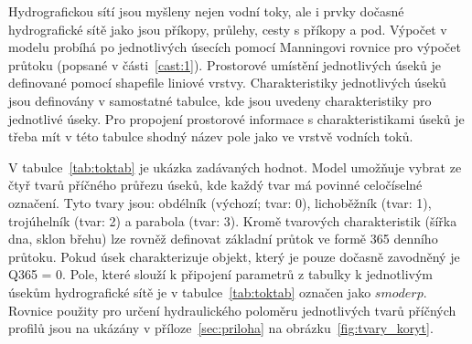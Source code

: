 Hydrografickou sítí jsou myšleny nejen vodní toky, ale i prvky dočasné hydrografické sítě jako jsou příkopy, průlehy, cesty s příkopy a pod. Výpočet v modelu probíhá po jednotlivých úsecích pomocí Manningovi rovnice pro výpočet průtoku (popsané v části~\ref{cast:1}). Prostorové umístění jednotlivých úseků je definované pomocí shapefile liniové vrstvy. Charakteristiky jednotlivých úseků jsou definovány v samostatné tabulce, kde jsou uvedeny charakteristiky pro jednotlivé úseky. Pro propojení prostorové informace s charakteristikami úseků je třeba mít v této tabulce shodný název pole jako ve vrstvě vodních toků.

V tabulce~\ref{tab:toktab} je ukázka zadávaných hodnot.  Model umožňuje vybrat ze čtyř tvarů příčného průřezu úseků, kde každý tvar má povinné celočíselné označení. Tyto tvary jsou: obdélník (výchozí; tvar: 0), lichoběžník (tvar: 1), trojúhelník (tvar: 2) a parabola (tvar: 3). Kromě tvarových charakteristik (šířka dna, sklon břehu) lze rovněž definovat základní průtok ve formě 365 denního průtoku. Pokud úsek charakterizuje objekt, který je pouze dočasně zavodněný je Q365 = 0. Pole, které slouží k připojení parametrů z tabulky k jednotlivým úsekům hydrografické sítě je v tabulce~\ref{tab:toktab} označen jako $smoderp$. Rovnice použity pro určení hydraulického poloměru jednotlivých tvarů příčných profilů jsou na ukázány v příloze~\ref{sec:priloha} na obrázku~\ref{fig:tvary_koryt}.
% 

